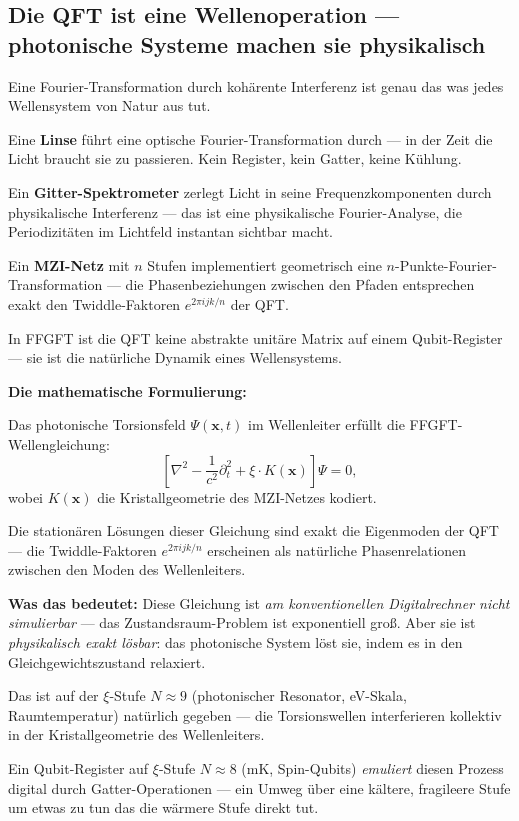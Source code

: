 \subsection{Die QFT ist eine Wellenoperation ---
  photonische Systeme machen sie physikalisch}

Eine Fourier-Transformation durch kohärente Interferenz
ist genau das was jedes Wellensystem von Natur aus tut.

Eine \textbf{Linse} führt eine optische
Fourier-Transformation durch --- in der Zeit
die Licht braucht sie zu passieren.
Kein Register, kein Gatter, keine Kühlung.

Ein \textbf{Gitter-Spektrometer} zerlegt Licht
in seine Frequenzkomponenten durch physikalische
Interferenz --- das ist eine physikalische
Fourier-Analyse, die Periodizitäten im Lichtfeld
instantan sichtbar macht.

Ein \textbf{MZI-Netz} mit $n$ Stufen implementiert
geometrisch eine $n$-Punkte-Fourier-Transformation ---
die Phasenbeziehungen zwischen den Pfaden entsprechen
exakt den Twiddle-Faktoren $e^{2\pi i jk/n}$ der QFT.

\begin{foundation}
In FFGFT ist die QFT keine abstrakte unitäre Matrix
auf einem Qubit-Register ---
sie ist die natürliche Dynamik eines Wellensystems.

\textbf{Die mathematische Formulierung:}

Das photonische Torsionsfeld $\Psi(\mathbf{x}, t)$
im Wellenleiter erfüllt die FFGFT-Wellengleichung:
\begin{equation}
  \label{eq:photon-wave}
  \left[\nabla^2 - \frac{1}{c^2}\partial_t^2
  + \xi \cdot K(\mathbf{x})\right]\Psi = 0,
\end{equation}
wobei $K(\mathbf{x})$ die Kristallgeometrie des
MZI-Netzes kodiert.

Die stationären Lösungen dieser Gleichung sind
exakt die Eigenmoden der QFT ---
die Twiddle-Faktoren $e^{2\pi i jk/n}$
erscheinen als natürliche Phasenrelationen
zwischen den Moden des Wellenleiters.

\textbf{Was das bedeutet:}
Diese Gleichung ist \emph{am konventionellen
Digitalrechner nicht simulierbar} ---
das Zustandsraum-Problem ist exponentiell groß.
Aber sie ist \emph{physikalisch exakt lösbar}:
das photonische System löst sie, indem es
in den Gleichgewichtszustand relaxiert.

Das ist auf der $\xi$-Stufe $N \approx 9$
(photonischer Resonator, eV-Skala, Raumtemperatur)
natürlich gegeben --- die Torsionswellen interferieren
kollektiv in der Kristallgeometrie des Wellenleiters.

Ein Qubit-Register auf $\xi$-Stufe $N \approx 8$
(mK, Spin-Qubits) \emph{emuliert} diesen Prozess
digital durch Gatter-Operationen ---
ein Umweg über eine kältere, fragileere Stufe
um etwas zu tun das die wärmere Stufe direkt tut.
\end{foundation}


